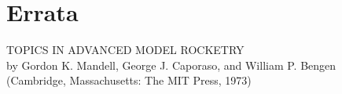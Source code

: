 \chapter{Errata}\label{supp:errata}

\noindent TOPICS IN ADVANCED MODEL ROCKETRY\\
by Gordon K. Mandell, George J. Caporaso, and William P. Bengen\\
(Cambridge, Massachusetts: The MIT Press, 1973)

